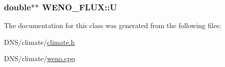 \subsubsection[{\texorpdfstring{U}{U}}]{\setlength{\rightskip}{0pt plus 5cm}double$\ast$$\ast$ W\+E\+N\+O\+\_\+\+F\+L\+U\+X\+::U}\hypertarget{class_w_e_n_o___f_l_u_x_acb0a4200fa2698cc6dcd2d2d31077d81}{}\label{class_w_e_n_o___f_l_u_x_acb0a4200fa2698cc6dcd2d2d31077d81}


The documentation for this class was generated from the following files\+:\begin{DoxyCompactItemize}
\item 
D\+N\+S/climate/\hyperlink{climate_8h}{climate.\+h}\item 
D\+N\+S/climate/\hyperlink{weno_8cpp}{weno.\+cpp}\end{DoxyCompactItemize}
